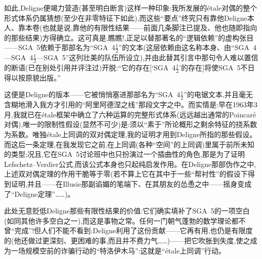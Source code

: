 如此,Deligne便竭力营造(甚至明白断言)这样一种印象:我所发展的étale对偶的整个形式体系仍属猜想(至少在非零特征下如此),而这些“要点”终究只有靠他Deligne本人、靠本卷(也就是说,靠他的有限性结果——前面几条脚注已提及、他也随即指向的那些结果)方得确立。这可真是,瞧瞧!,正足以替那著名的“逻辑依赖”的虚构张目——SGA~5依赖于那部名为“SGA~4$\frac{1}{2}$”的文本(这层依赖由这名称本身、由“SGA~4—SGA~4$\frac{1}{2}$—SGA~5”这列壮美的队伍所设立),并由此替其引言中那句令人难以置信的断语(已在别处引用并评注过)开脱:“它的存在[‘SGA~4$\frac{1}{2}$’的存在]将使SGA~5不日得以按原貌出版。”

这便是Deligne的版本——它被悄悄塞进那部名为“SGA~4$\frac{1}{2}$”的电锯文本,并且毫无含糊地滑入我方才引用的“阿里阿德涅之线”那段文字之中。而实情是:早在1963年3月,我就已在étale框架中确立了六种运算的完整形式体系(远远越出通常的Poincaré对偶),唯一的限制性假设(显然不可少)是:须以“素于”所论概形之剩余特征的挠系数为系数。唯独étale上同调的双对偶定理,我的证明才用到Deligne所指的那些假设。而这后一条定理,在我发现它之前,在上同调(各种“空间”的上同调)里属于前所未知的类型;况且,它在SGA~5讨论班中也只扮演过一个插曲性的角色,那是为了证明Lefschetz--Verdier公式,而该公式本身也只起纯启发作用。在Deligne那部伪作之中,上述双对偶定理的作用干脆等于零(若不算上它在其中于一些“帮衬性”的假设下得到证明,并且——在Illusie那副谄媚的笔端下、在其朋友的怂恿之中——摇身变成了“Deligne定理”……)。

此处无意贬低Deligne那些有限性结果的价值:它们确实填补了SGA~5的一项空白(如同其他许多空白之一),而这是事物之常。任何一门朝气蓬勃的数学理论都不曾“完成”!但人们不能不看到:Deligne利用了这份贡献——它再有用,也仍是有限度的(他还做过更深刻、更困难的事,而且并不费力气……)——把它吹胀到失度,使之成为一场规模空前的诈骗行动的“特洛伊木马”:这就是“étale上同调”行动。

